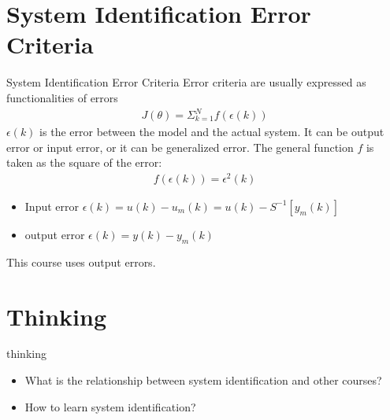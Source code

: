 \section{System Identification Error Criteria}
\begin{frame}{System Identification Error Criteria}
Error criteria are usually expressed as functionalities of errors
\begin{eqnarray}
J(\theta)=\Sigma_{k=1}^Nf(\epsilon(k))
\end{eqnarray}
$\epsilon(k)$ is the error between the model and the actual system. It can be output error or input error, or it can be generalized error. The general function $f$ is taken as the square of the error:
\begin{eqnarray}
f(\epsilon(k))=\epsilon^2(k)
\end{eqnarray}
\begin{itemize}
\item Input error $\epsilon(k)=u(k)-u_m(k)=u(k)-S^{-1}[y_m(k)]$
\item output error $\epsilon(k)=y(k)-y_m(k)$
\end{itemize}
This course uses output errors.
\end{frame}

\section{Thinking}
\begin{frame}{thinking}
\begin{itemize}
\item What is the relationship between system identification and other courses?
\item How to learn system identification?
\end{itemize}
\end{frame}


